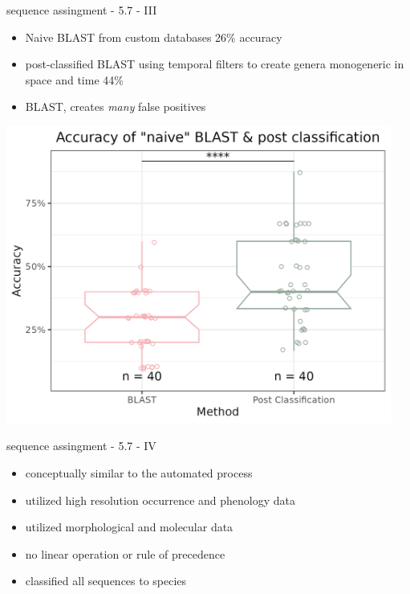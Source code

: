 \documentclass[
  ignorenonframetext,
]{beamer}
\providecommand{\tightlist}{%
  \setlength{\itemsep}{0pt}\setlength{\parskip}{0pt}}
\begin{document}
\begin{frame}{sequence assingment - 5.7 - III}
\protect\hypertarget{sequence-assingment---5.7---iii}{}
\begin{itemize}
\tightlist
\item
  Naive BLAST from custom databases 26\% accuracy
\item
  post-classified BLAST using temporal filters to create genera
  monogeneric in space and time 44\%
\item
  BLAST, creates \emph{many} false positives
\end{itemize}

\includegraphics[width=0.95\textwidth,height=\textheight]{../graphics/plots/Accuracy_BLAST.png}
\end{frame}

\begin{frame}{sequence assingment - 5.7 - IV}
\protect\hypertarget{sequence-assingment---5.7---iv}{}
\begin{itemize}
\tightlist
\item
  conceptually similar to the automated process
\item
  utilized high resolution occurrence and phenology data
\item
  utilized morphological and molecular data
\item
  no linear operation or rule of precedence
\item
  classified all sequences to species
\end{itemize}

\end{frame}
\end{document}

